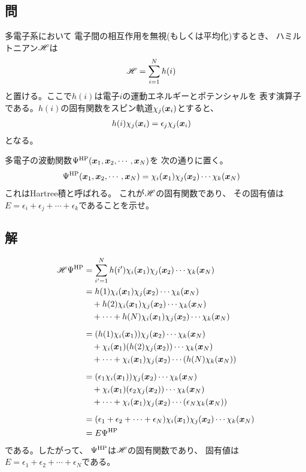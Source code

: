 \subsection{問}
多電子系において
電子間の相互作用を無視(もしくは平均化)するとき、
ハミルトニアン${\mathscr{H}}$は
\begin{align}
	{\ensuremath{\mathscr{H}}}
&=
	\sum_{i=1}^N h(i)
\end{align}
と置ける。ここで$h(i)$は電子$i$の運動エネルギーとポテンシャルを
表す演算子である。$h(i)$の固有関数をスピン軌道$\chi_j({\bm{x}}_i)$とすると、
\begin{align}
	h(i) \chi_j({\bm{x}}_i)
&=
	\epsilon_j \chi_j({\bm{x}}_i)
\end{align}
となる。

多電子の波動関数$\Psi^{\rm HP}({\bm{x}}_1,{\bm{x}}_2,\cdots,{\bm{x}}_N)$を
次の通りに置く。
\begin{align}
	\Psi^{\rm HP}({\bm{x}}_1,{\bm{x}}_2,\cdots,{\bm{x}}_N)
&=
	\chi_i({\bm{x}}_1)\chi_j({\bm{x}}_2)\cdots\chi_k({\bm{x}}_N)
\end{align}
これはHartree積と呼ばれる。
これが${\mathscr{H}}$の固有関数であり、
その固有値は$E=\epsilon_i+\epsilon_j+\cdots+\epsilon_k$であることを示せ。

\subsection{解}
\begin{align}
	\H\Psi^{\rm HP}
&=
	\sum_{i'=1}^N
		h(i') \chi_i(\x_1) \chi_j(\x_2) \cdots \chi_k(\x_N) \\
%
%
&=
	h(1) \chi_i(\x_1) \chi_j(\x_2) \cdots \chi_k(\x_N) \nonumber\\&\quad
	+
	h(2) \chi_i(\x_1) \chi_j(\x_2) \cdots \chi_k(\x_N) \nonumber\\&\quad
	+
	\cdots
	+
	h(N) \chi_i(\x_1) \chi_j(\x_2) \cdots \chi_k(\x_N) \\[2mm]
%
%
&=
	(h(1) \chi_i(\x_1)) \chi_j(\x_2) \cdots \chi_k(\x_N) \nonumber\\&\quad
	+
	\chi_i(\x_1) (h(2)\chi_j(\x_2)) \cdots \chi_k(\x_N) \nonumber\\&\quad
	+
	\cdots
	+
	\chi_i(\x_1) \chi_j(\x_2) \cdots (h(N)\chi_k(\x_N)) \\[2mm]
%
%
&=
	(\epsilon_1 \chi_i(\x_1)) \chi_j(\x_2) \cdots \chi_k(\x_N) \nonumber\\&\quad
	+
	\chi_i(\x_1) (\epsilon_2\chi_j(\x_2)) \cdots \chi_k(\x_N) \nonumber\\&\quad
	+
	\cdots
	+
	\chi_i(\x_1) \chi_j(\x_2) \cdots (\epsilon_N\chi_k(\x_N)) \\[2mm]
%
%
&=
	(\epsilon_1+\epsilon_2+\cdots+\epsilon_N)
		\chi_i(\x_1)\chi_j(\x_2)\cdots\chi_k(\x_N) \\
%
%
&=
	E \Psi^{\rm HP}
\end{align}
である。したがって、
$\Psi^{\rm HP}$は${\mathscr{H}}$の固有関数であり、
固有値は$E=\epsilon_1+\epsilon_2+\cdots+\epsilon_N$である。


